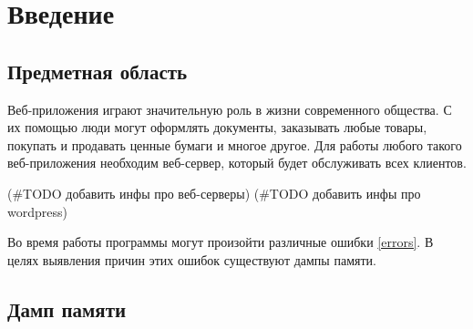 \documentclass[20pt]{article}
\begin{document}
\newpage

\tableofcontents

\newpage

\section{Введение}

\subsection{Предметная область}

Веб-приложения играют значительную роль в жизни современного общества. С их
помощью люди могут оформлять документы, заказывать любые товары, покупать и
продавать ценные бумаги и многое другое. Для работы любого такого веб-приложения
необходим веб-сервер, который будет обслуживать всех клиентов.

(\#TODO добавить инфы про веб-серверы)
(\#TODO добавить инфы про wordpress)

Во время работы программы могут произойти различные ошибки\cite{error-types} \ref{errors}.
В целях выявления причин этих ошибок существуют дампы памяти.

\subsection{Дамп памяти}
\end{document}
